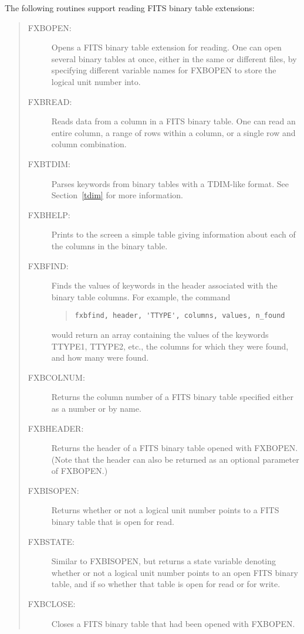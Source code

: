 The following routines support reading FITS binary table extensions:
\begin{quote}
\begin{description}
\item[FXBOPEN:]
Opens a FITS binary table extension for reading.  One can open several binary
tables at once, either in the same or different files, by specifying different
variable names for FXBOPEN to store the logical unit number into.
\item[FXBREAD:]
Reads data from a column in a FITS binary table.  One can read an entire
column, a range of rows within a column, or a single row and column
combination.
\item[FXBTDIM:]
Parses keywords from binary tables with a TDIM-like format.  See
Section~\ref{tdim} for more information.
\item[FXBHELP:]
Prints to the screen a simple table giving information about each of the
columns in the binary table.
\item[FXBFIND:]
Finds the values of keywords in the header associated with the binary table
columns.  For example, the command
\begin{quote}
\begin{verbatim}
fxbfind, header, 'TTYPE', columns, values, n_found
\end{verbatim}
\end{quote}
would return an array containing the values of the keywords TTYPE1, TTYPE2,
etc., the columns for which they were found, and how many were found.
\item[FXBCOLNUM:]
Returns the column number of a FITS binary table specified either as a number
or by name.
\item[FXBHEADER:]
Returns the header of a FITS binary table opened with FXBOPEN.  (Note that the
header can also be returned as an optional parameter of FXBOPEN.)
\item[FXBISOPEN:]
Returns whether or not a logical unit number points to a FITS binary table that
is open for read.
\item[FXBSTATE:]
Similar to FXBISOPEN, but returns a state variable denoting whether or not a
logical unit number points to an open FITS binary table, and if so whether that
table is open for read or for write.
\item[FXBCLOSE:]
Closes a FITS binary table that had been opened with FXBOPEN.
\end{description}
\end{quote}

